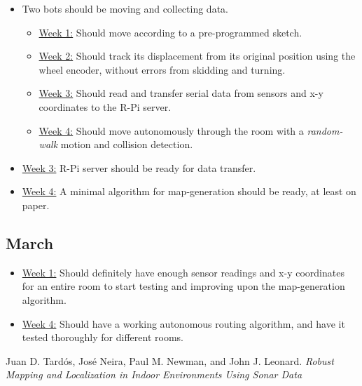 \documentclass[12pt]{article}
\begin{document}
\begin{itemize}
    \item
        Two bots should be moving and collecting data.
        \begin{itemize}
        \item
            \underline{Week 1:} Should move according to a pre-programmed sketch.
        \item
            \underline{Week 2:} Should track its displacement from its original
            position using the wheel encoder, without errors from skidding and turning.
        \item
            \underline{Week 3:} Should read and transfer serial data from sensors and
            x-y coordinates to the R-Pi server.
        \item
            \underline{Week 4:} Should move autonomously through the room with a
            \textit{random-walk} motion and collision detection.
        \end{itemize}

    \item
        \underline{Week 3:} R-Pi server should be ready for data transfer.
    \item
        \underline{Week 4:} A minimal algorithm for map-generation should be ready, at least on paper.
\end{itemize}

\subsection{March}

\begin{itemize}
    \item
        \underline{Week 1:} Should definitely have enough sensor readings and x-y coordinates for
        an entire room to start testing and improving upon the map-generation
        algorithm.
        
    \item
        \underline{Week 4:} Should have a working autonomous routing algorithm, and have it tested thoroughly
        for different rooms.

\end{itemize}

\begin{thebibliography}{1}

Juan D. Tardós, José Neira, Paul M. Newman, and John J. Leonard.
\textit{Robust Mapping and Localization in Indoor Environments Using Sonar Data}
\end{thebibliography}
\end{document}
